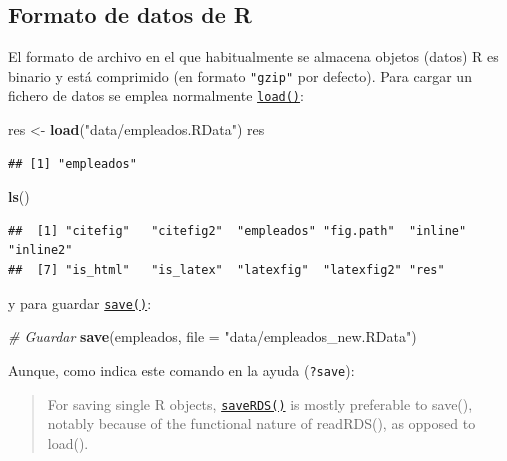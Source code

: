 \documentclass[
]{book}
\newenvironment{Shaded}{\begin{snugshade}}{\end{snugshade}}
\newcommand{\CommentTok}[1]{\textcolor[rgb]{0.56,0.35,0.01}{\textit{#1}}}
\newcommand{\DataTypeTok}[1]{\textcolor[rgb]{0.13,0.29,0.53}{#1}}
\newcommand{\KeywordTok}[1]{\textcolor[rgb]{0.13,0.29,0.53}{\textbf{#1}}}
\newcommand{\NormalTok}[1]{#1}
\newcommand{\StringTok}[1]{\textcolor[rgb]{0.31,0.60,0.02}{#1}}
\begin{document}
\hypertarget{formato-de-datos-de-r}{%
\subsection{Formato de datos de R}\label{formato-de-datos-de-r}}

El formato de archivo en el que habitualmente se almacena objetos (datos)
R es binario y está comprimido (en formato \texttt{"gzip"} por defecto).
Para cargar un fichero de datos se emplea normalmente \href{https://www.rdocumentation.org/packages/base/versions/3.6.1/topics/load}{\texttt{load()}}:

\begin{Shaded}
\begin{Highlighting}[]
\NormalTok{res <-}\StringTok{ }\KeywordTok{load}\NormalTok{(}\StringTok{"data/empleados.RData"}\NormalTok{)}
\NormalTok{res}
\end{Highlighting}
\end{Shaded}

\begin{verbatim}
## [1] "empleados"
\end{verbatim}

\begin{Shaded}
\begin{Highlighting}[]
\KeywordTok{ls}\NormalTok{()}
\end{Highlighting}
\end{Shaded}

\begin{verbatim}
##  [1] "citefig"   "citefig2"  "empleados" "fig.path"  "inline"    "inline2"  
##  [7] "is_html"   "is_latex"  "latexfig"  "latexfig2" "res"
\end{verbatim}

y para guardar \href{https://www.rdocumentation.org/packages/base/versions/3.6.1/topics/save}{\texttt{save()}}:

\begin{Shaded}
\begin{Highlighting}[]
\CommentTok{# Guardar}
\KeywordTok{save}\NormalTok{(empleados, }\DataTypeTok{file =} \StringTok{"data/empleados_new.RData"}\NormalTok{)}
\end{Highlighting}
\end{Shaded}

Aunque, como indica este comando en la ayuda (\texttt{?save}):

\begin{quote}
For saving single R objects, \href{https://www.rdocumentation.org/packages/base/versions/3.6.1/topics/saveRDS}{\texttt{saveRDS()}}
is mostly preferable to save(),
notably because of the functional nature of readRDS(), as opposed to load().
\end{quote}
\end{document}
